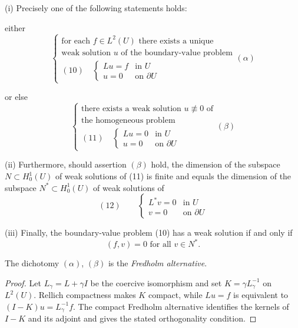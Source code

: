 \begin{theorem}
\label{thm:second-existence-fredholm-alternative}
(i) Precisely one of the following statements holds:

either
$$\begin{cases} \text{for each } f \in L^2(U) \text{ there exists a unique} \\ \text{weak solution } u \text{ of the boundary-value problem} \\ (10) \quad \begin{cases} Lu = f & \text{in } U \\ u = 0 & \text{on } \partial U \end{cases} \end{cases} (\alpha)$$

or else
$$\begin{cases} \text{there exists a weak solution } u \not\equiv 0 \text{ of} \\ \text{the homogeneous problem} \\ (11) \quad \begin{cases} Lu = 0 & \text{in } U \\ u = 0 & \text{on } \partial U \end{cases} \end{cases} (\beta)$$

(ii) Furthermore, should assertion $(\beta)$ hold, the dimension of the subspace $N \subset H_0^1(U)$ of weak solutions of (11) is finite and equals the dimension of the subspace $N^* \subset H_0^1(U)$ of weak solutions of
$$(12) \qquad \begin{cases} L^*v = 0 & \text{in } U \\ v = 0 & \text{on } \partial U \end{cases}$$

(iii) Finally, the boundary-value problem (10) has a weak solution if and only if
$$(f,v) = 0 \text{ for all } v \in N^*.$$

The dichotomy $(\alpha)$, $(\beta)$ is the \textit{Fredholm alternative}.
\end{theorem}

\begin{proof}
\sketch Let $L_\gamma=L+\gamma I$ be the coercive isomorphism and set $K=\gamma L_\gamma^{-1}$ on $L^2(U)$. Rellich compactness makes $K$ compact, while $Lu=f$ is equivalent to $(I-K)u=L_\gamma^{-1}f$. The compact Fredholm alternative identifies the kernels of $I-K$ and its adjoint and gives the stated orthogonality condition.
\end{proof}

